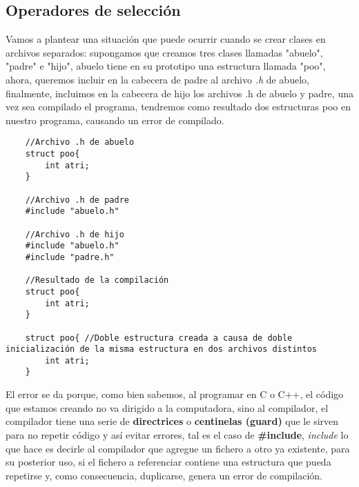 \subsection{Operadores de selección}
\hspace{0.55cm}Vamos a plantear una situación que puede ocurrir cuando se crear clases en archivos separados: supongamos que creamos tres clases llamadas "abuelo", "padre" e "hijo", abuelo tiene en su prototipo una estructura llamada "poo", ahora, queremos incluir en la cabecera de padre al archivo \textit{.h} de abuelo, finalmente, incluimos en la cabecera de hijo los archivos .h de abuelo y padre, una vez sea compilado el programa, tendremos como resultado dos estructuras poo en nuestro programa, causando un error de compilado.
\begin{lstlisting}
    //Archivo .h de abuelo
    struct poo{
        int atri;
    }
    
    //Archivo .h de padre
    #include "abuelo.h"
    
    //Archivo .h de hijo
    #include "abuelo.h"
    #include "padre.h"
    
    //Resultado de la compilación
    struct poo{
        int atri;
    }
    
    struct poo{ //Doble estructura creada a causa de doble inicialización de la misma estructura en dos archivos distintos
        int atri;
    }
\end{lstlisting}

El error se da porque, como bien sabemos, al programar en C o C++, el código que estamos creando no va dirigido a la computadora, sino al compilador, el compilador tiene una serie de \textbf{directrices} o \textbf{centinelas (guard)} que le sirven para no repetir código y así evitar errores, tal es el caso de \textbf{\#include}, \textit{include} lo que hace es decirle al compilador que agregue un fichero a otro ya existente, para su posterior uso, si el fichero a referenciar contiene una estructura que pueda repetirse y, como consecuencia, duplicarse, genera un error de compilación.

